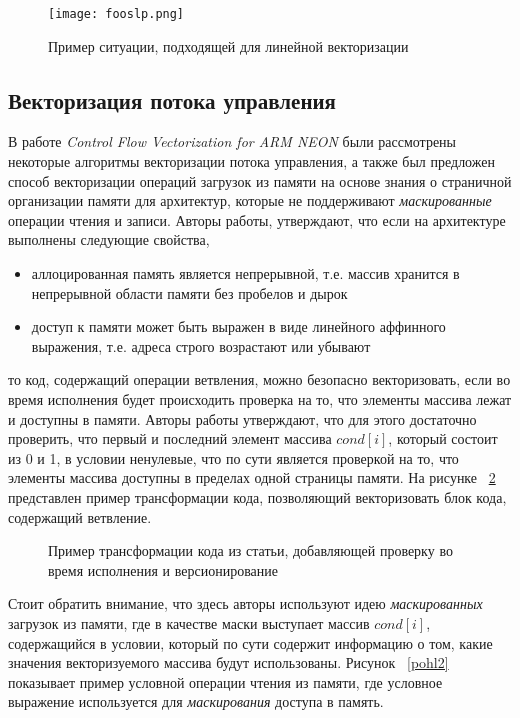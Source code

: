 \begin{figure}[!htb]
    \centering
    \texttt{[image: fooslp.png]}
    \caption{Пример ситуации, подходящей для линейной векторизации}
    \label{fooslp}
\end{figure}

\subsection{Векторизация потока управления}
В работе \textit{Control Flow Vectorization for ARM NEON} \cite{pohl2018control} были рассмотрены некоторые алгоритмы векторизации потока управления, а также был предложен способ векторизации операций загрузок из памяти на основе знания о страничной организации памяти для архитектур, которые не поддерживают \textit{маскированные} \cite{intel2017architecture} операции чтения и записи. Авторы работы, утверждают, что если на архитектуре выполнены следующие свойства,

\begin{itemize}
    \item аллоцированная память является непрерывной, т.е. массив хранится в непрерывной области памяти без пробелов и дырок
    \item доступ к памяти может быть выражен в виде линейного аффинного выражения, т.е. адреса строго возрастают или убывают
\end{itemize}

то код, содержащий операции ветвления, можно безопасно векторизовать, если во время исполнения будет происходить проверка на то, что элементы массива лежат и доступны в памяти. Авторы работы утверждают, что для этого достаточно проверить, что первый и последний элемент массива $cond[i]$, который состоит из 0 и 1, в условии ненулевые, что по сути является проверкой на то, что элементы массива доступны в пределах одной страницы памяти. На рисунке ~\ref{pohl1} представлен пример трансформации кода, позволяющий векторизовать блок кода, содержащий ветвление.

\begin{figure}[!htb]
    \centering
    
    \caption{Пример трансформации кода из статьи, добавляющей проверку во время исполнения и версионирование}
    \label{pohl1}
\end{figure}

Стоит обратить внимание, что здесь авторы используют идею \textit{маскированных} загрузок из памяти, где в качестве маски выступает массив $cond[i]$, содержащийся в условии, который по сути содержит информацию о том, какие значения векторизуемого массива будут использованы. Рисунок ~\ref{pohl2} показывает пример условной операции чтения из памяти, где условное выражение используется для \textit{маскирования} доступа в память.


